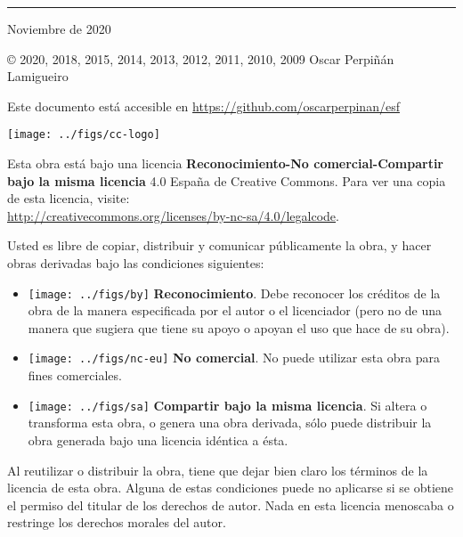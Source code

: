 
\chapterprecis{\vfill{}
}
\rule[.5ex]{\linewidth}{1pt} 

Noviembre de 2020

© 2020, 2018, 2015, 2014, 2013, 2012, 2011, 2010, 2009 Oscar Perpiñán Lamigueiro

Este documento está accesible en \url{https://github.com/oscarperpinan/esf}

\begin{center}
\texttt{[image: ../figs/cc-logo]}
\par\end{center}

Esta obra está bajo una licencia \textbf{Reconocimiento-No comercial-Compartir
bajo la misma licencia} 4.0 España de Creative Commons. Para ver una
copia de esta licencia, visite:\\
 \url{http://creativecommons.org/licenses/by-nc-sa/4.0/legalcode}.

Usted es libre de copiar, distribuir y comunicar públicamente la obra,
y hacer obras derivadas bajo las condiciones siguientes:
\begin{itemize}
\item \texttt{[image: ../figs/by]} \textbf{Reconocimiento}.
Debe reconocer los créditos de la obra de la manera especificada por
el autor o el licenciador (pero no de una manera que sugiera que tiene
su apoyo o apoyan el uso que hace de su obra). 
\item \texttt{[image: ../figs/nc-eu]} \textbf{No comercial}.
No puede utilizar esta obra para fines comerciales. 
\item \texttt{[image: ../figs/sa]} \textbf{Compartir bajo la
misma licencia}. Si altera o transforma esta obra, o genera una obra
derivada, sólo puede distribuir la obra generada bajo una licencia
idéntica a ésta. 
\end{itemize}
Al reutilizar o distribuir la obra, tiene que dejar bien claro los
términos de la licencia de esta obra. Alguna de estas condiciones
puede no aplicarse si se obtiene el permiso del titular de los derechos
de autor. Nada en esta licencia menoscaba o restringe los derechos
morales del autor.

